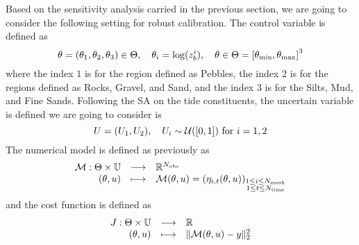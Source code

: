 \documentclass[../../Main_ManuscritThese.tex]{subfiles}
\newcommand{\zob}{z_b}
\begin{document}
Based on the sensitivity analysis carried in the previous section, we
are going to consider the following setting for robust calibration.
The control variable is defined as
\begin{equation}
  \kk=\left(\kk_1,\kk_2,\kk_3\right) \in \Kspace, \quad \kk_i = \log(\zob^i), \quad \KK \in \Kspace = \interval{\kk_{\min}}{\kk_{\max}}^3
  \end{equation}
  where the index $1$ is for the region defined as Pebbles, the index
  $2$ is for the regions defined as Rocks, Gravel, and Sand, and the
  index $3$ is for the Silts, Mud, and Fine Sands.  Following the SA
  on the tide constituents, the uncertain variable is defined we are
  going to consider is
\begin{equation}
  \UU = (\UU_1,\UU_2), \quad \UU_i \sim \mathcal{U}(\interval{0}{1}) \text{ for } i=1,2
\end{equation}
The numerical model is defined as previously as
\begin{equation}
  \begin{array}{rcl}
    \mathcal{M}: \Theta \times \mathbb{U} &\longrightarrow& \mathbb{R}^{N_{\mathrm{obs}}} \\
    (\theta, u)& \longmapsto & \mathcal{M}(\theta, u) = \left(\eta_{i,t}(\theta, u)\right)_{\substack{1 \leq i \leq N_{\mathrm{mesh}} \\ 1 \leq t \leq N_{\mathrm{time}}}} \\ 
  \end{array}
\end{equation}
and the cost function is defined as
\begin{equation}
  \begin{array}{rcl}
    J: \Theta \times \mathbb{U} & \longrightarrow & \mathbb{R} \\
    (\theta, u) & \longmapsto & \|\mathcal{M}(\theta, u) - y \|^2_2
  \end{array}
\end{equation}
\end{document}
